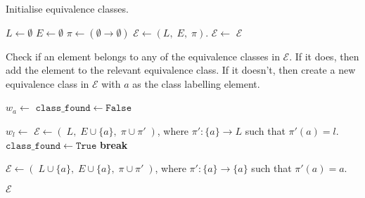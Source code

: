 \begin{algorithm}[H]
\caption{Initialise equivalence classes.}
\hrulefill
\begin{algorithmic}[1]
    \State $L \gets \emptyset$
    \State $E \gets \emptyset$
    \State $\pi \gets (\emptyset \to \emptyset)$
    \State $\mathcal{E} \gets (L, \; E, \; \pi)$.
        \State $\mathcal{E} \gets$ 
    \EndFor
    \State \Return $\mathcal{E}$
\EndProcedure
\end{algorithmic}
\end{algorithm}


\begin{algorithm}[H]
\caption{
 Check if an element belongs to any of the equivalence classes in $\mathcal{E}$.
 If it does, then add the element to the relevant equivalence class.
 If it doesn't, then create a new equivalence class in $\mathcal{E}$ with $a$ as the class labelling element.
}
\hrulefill
\begin{algorithmic}[1]
    \State $w_{a} \gets$ 
    \State $\texttt{class$\_$found} \gets \texttt{False}$

            \State $w_{l} \gets$ 
                \Statex {}
                \State $\mathcal{E} \gets (\; L, \; E \cup \{a\}, \; \pi \cup \pi' \;)$, where $\pi': \{a\} \to L$ such that $\pi'(a) = l$.
                \State $\texttt{class$\_$found} \gets \texttt{True}$
                \State \textbf{break}
            \EndIf
        \EndFor
        
            \Statex {}
            \State $\mathcal{E} \gets (\; L \cup \{a\}, \; E \cup \{a\}, \; \pi \cup \pi' \;)$, where $\pi': \{a\} \to \{a\}$ such that $\pi'(a) = a$.
        \EndIf
        
    \State \Return $\mathcal{E}$
\EndProcedure
\end{algorithmic}
\end{algorithm}


